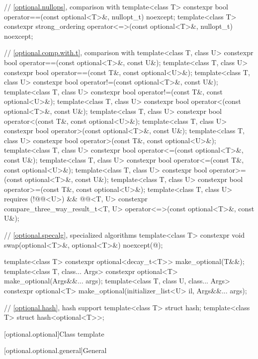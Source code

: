 \begin{codeblock}
{  // \ref{optional.nullops}, comparison with 
  template<class T> constexpr bool operator==(const optional<T>&, nullopt_t) noexcept;
  template<class T>
    constexpr strong_ordering operator<=>(const optional<T>&, nullopt_t) noexcept;

  // \ref{optional.comp.with.t}, comparison with 
  template<class T, class U> constexpr bool operator==(const optional<T>&, const U&);
  template<class T, class U> constexpr bool operator==(const T&, const optional<U>&);
  template<class T, class U> constexpr bool operator!=(const optional<T>&, const U&);
  template<class T, class U> constexpr bool operator!=(const T&, const optional<U>&);
  template<class T, class U> constexpr bool operator<(const optional<T>&, const U&);
  template<class T, class U> constexpr bool operator<(const T&, const optional<U>&);
  template<class T, class U> constexpr bool operator>(const optional<T>&, const U&);
  template<class T, class U> constexpr bool operator>(const T&, const optional<U>&);
  template<class T, class U> constexpr bool operator<=(const optional<T>&, const U&);
  template<class T, class U> constexpr bool operator<=(const T&, const optional<U>&);
  template<class T, class U> constexpr bool operator>=(const optional<T>&, const U&);
  template<class T, class U> constexpr bool operator>=(const T&, const optional<U>&);
  template<class T, class U>
      requires (!@@<U>) && @@<T, U>
    constexpr compare_three_way_result_t<T, U>
      operator<=>(const optional<T>&, const U&);

  // \ref{optional.specalg}, specialized algorithms
  template<class T>
    constexpr void swap(optional<T>&, optional<T>&) noexcept(@\seebelow@);

  template<class T>
    constexpr optional<decay_t<T>> make_optional(T&&);
  template<class T, class... Args>
    constexpr optional<T> make_optional(Args&&... args);
  template<class T, class U, class... Args>
    constexpr optional<T> make_optional(initializer_list<U> il, Args&&... args);

  // \ref{optional.hash}, hash support
  template<class T> struct hash;
  template<class T> struct hash<optional<T>>;
}
\end{codeblock}

[optional.optional]{Class template  }

[optional.optional.general]{General}


